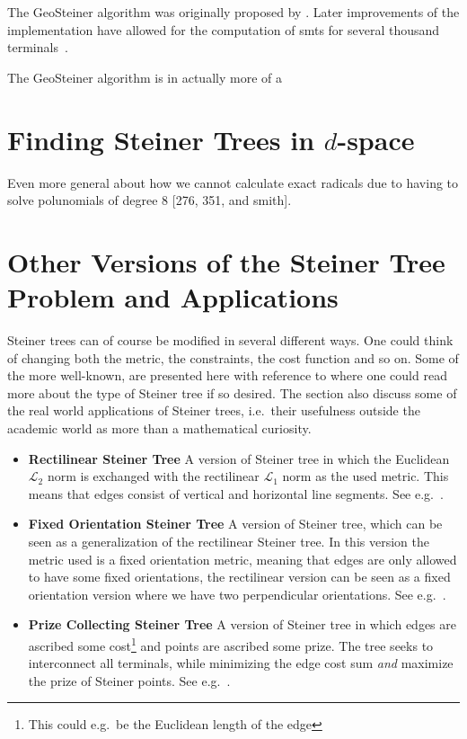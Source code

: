 The GeoSteiner algorithm was originally proposed by \textcite{winter1985}. Later
improvements of the implementation have allowed for the computation of \acp{smt}
for several thousand terminals~\cite{brazil2015}.

The GeoSteiner algorithm is in actually more of a


\section{Finding Steiner Trees in $d$-space}
\label{sec:find-stein-trees-d}

Even more general about how we cannot calculate exact radicals due to having to
solve polunomials of degree 8 [276, 351, and smith].


\section{Other Versions of the Steiner Tree Problem and Applications}
\label{sec:other-vers-stein}

Steiner trees can of course be modified in several different ways. One could
think of changing both the metric, the constraints, the cost function and so
on. Some of the more well-known, are presented here with reference to where one
could read more about the type of Steiner tree if so desired. The section also discuss
some of the real world applications of Steiner trees, i.e.\ their usefulness
outside the academic world as more than a mathematical curiosity.

\begin{itemize}
\item \textbf{Rectilinear Steiner Tree} \quad A version of Steiner tree in which
  the Euclidean $\mathcal{L}_2$ norm is exchanged with the rectilinear
  $\mathcal{L}_1$ norm as the used metric. This means that edges consist of
  vertical and horizontal line segments. See e.g.~\cite[ch.~3]{brazil2015}.
\item \textbf{Fixed Orientation Steiner Tree} \quad A version of Steiner tree,
  which can be seen as a generalization of the rectilinear Steiner tree. In
  this version the metric used is a fixed orientation metric, meaning that edges
  are only allowed to have some fixed orientations, the rectilinear version can
  be seen as a fixed orientation version where we have two perpendicular
  orientations. See e.g.~\cite[ch.~2]{brazil2015}.
\item \textbf{Prize Collecting Steiner Tree} \quad A version of Steiner tree in
  which edges are ascribed some cost\footnote{This could e.g.\ be the Euclidean
    length of the edge} and points are ascribed some prize. The tree seeks to
  interconnect all terminals, while minimizing the edge cost sum \textit{and}
  maximize the prize of Steiner points. See e.g.~\cite{johnson2000}.
\end{itemize}

